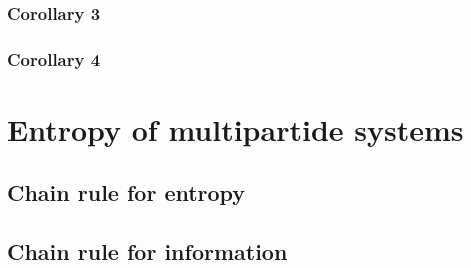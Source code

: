 \documentclass[a4paper, 12pt]{book}
\begin{document}
\subsubsection{Corollary 3}
\subsubsection{Corollary 4}

\section{Entropy of multipartide systems}
\subsection{Chain rule for entropy}
\subsection{Chain rule for information}
\end{document}
